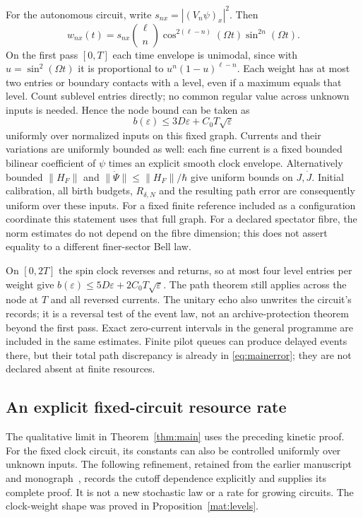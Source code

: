 \documentclass[11pt]{article}
\theoremstyle{definition}\newtheorem{definition}[theorem]{Definition}
\theoremstyle{remark}\newtheorem{remark}[theorem]{Remark}
\begin{document}
For the autonomous circuit, write $s_{nx}=|(V_n\psi)_x|^2$. Then
\[
 w_{nx}(t)=s_{nx}\binom{\ell}{n}
  \cos^{2(\ell-n)}(\Omega t)\sin^{2n}(\Omega t).
\]
On the first pass $[0,T]$ each time envelope is unimodal, since with $u=\sin^2(\Omega t)$ it is proportional to $u^n(1-u)^{\ell-n}$. Each weight has at most two entries or boundary contacts with a level, even if a maximum equals that level. Count sublevel entries directly; no common regular value across unknown inputs is needed. Hence the node bound can be taken as
\[
 b(\varepsilon)\le 3D\varepsilon+C_0T\sqrt\varepsilon
\]
uniformly over normalized inputs on this fixed graph. Currents and their variations are uniformly bounded as well: each fine current is a fixed bounded bilinear coefficient of $\psi$ times an explicit smooth clock envelope. Alternatively bounded $\|H_F\|$ and $\|\dot\Psi\|\le\|H_F\|/\hbar$ give uniform bounds on $J,\dot J$. Initial calibration, all birth budgets, $R_{\delta,N}$ and the resulting path error are consequently uniform over these inputs. For a fixed finite reference included as a configuration coordinate this statement uses that full graph. For a declared spectator fibre, the norm estimates do not depend on the fibre dimension; this does not assert equality to a different finer-sector Bell law.

On $[0,2T]$ the spin clock reverses and returns, so at most four level entries per weight give $b(\varepsilon)\le5D\varepsilon+2C_0T\sqrt\varepsilon$. The path theorem still applies across the node at $T$ and all reversed currents. The unitary echo also unwrites the circuit's records; it is a reversal test of the event law, not an archive-protection theorem beyond the first pass. Exact zero-current intervals in the general programme are included in the same estimates. Finite pilot queues can produce delayed events there, but their total path discrepancy is already in \eqref{eq:mainerror}; they are not declared absent at finite resources.

\subsection{An explicit fixed-circuit resource rate}
\label{kin:uniformity-rate}
The qualitative limit in Theorem~\ref{thm:main} uses the preceding
kinetic proof. For the fixed clock circuit, its constants can also be
controlled uniformly over unknown inputs. The following refinement,
retained from the earlier manuscript and monograph~\cite{PilotPrior,Monograph}, records the
cutoff dependence explicitly and supplies its complete proof. It is not
a new stochastic law or a rate for growing circuits. The clock-weight
shape was proved in Proposition~\ref{mat:levels}.
\end{document}
